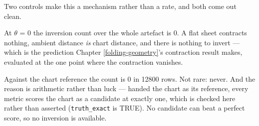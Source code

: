 \documentclass[
  british,
  a4paper,
]{book}
\newenvironment{Shaded}{\begin{snugshade}}{\end{snugshade}}
\newcommand{\DecValTok}[1]{\textcolor[rgb]{0.00,0.00,0.81}{#1}}
\newcommand{\FunctionTok}[1]{\textcolor[rgb]{0.13,0.29,0.53}{\textbf{#1}}}
\newcommand{\NormalTok}[1]{#1}
\newcommand{\OtherTok}[1]{\textcolor[rgb]{0.56,0.35,0.01}{#1}}
\newcommand{\SpecialCharTok}[1]{\textcolor[rgb]{0.81,0.36,0.00}{\textbf{#1}}}
\newcommand{\StringTok}[1]{\textcolor[rgb]{0.31,0.60,0.02}{#1}}
\begin{document}
\begin{Shaded}
\end{Shaded}

Two controls make this a mechanism rather than a rate, and both come out clean.

At \(\theta\) = 0 the inversion count over the whole artefact is
0. A flat sheet contracts nothing, ambient distance \emph{is}
chart distance, and there is nothing to invert --- which is the prediction
Chapter \ref{folding-geometry}'s contraction result makes, evaluated at the one
point where the contraction vanishes.

Against the chart reference the count is 0 in
12800 rows. Not rare: never. And the reason is arithmetic rather than
luck --- handed the chart as its reference, every metric scores the chart as a
candidate at exactly one, which is checked here rather than asserted
(\texttt{truth\_exact} is TRUE). No candidate can beat a perfect score, so
no inversion is available.
\end{document}
